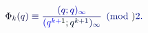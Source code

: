 \documentclass[12pt]{article}
\begin{document}
\makeatletter
\renewcommand*{\@textcolor}[3]{%
  \protect\leavevmode
  \begingroup
    \color#1{#2}#3%
  \endgroup
}
\makeatother
\begin{displaymath}
\mathcolor[RGB]{0,0,15}{\Phi} _ { \mathcolor[RGB]{0,0,30}{k} } \mathcolor[RGB]{0,0,45}{(} \mathcolor[RGB]{0,0,60}{q} \mathcolor[RGB]{0,0,75}{)} \mathcolor[RGB]{0,0,90}{\equiv} \mathcolor[RGB]{0,0,105}{\frac { \mathcolor[RGB]{0,0,120}{(} \mathcolor[RGB]{0,0,135}{q} \mathcolor[RGB]{0,0,150}{;} \mathcolor[RGB]{0,0,165}{q} \mathcolor[RGB]{0,0,180}{)} _ { \mathcolor[RGB]{0,0,195}{\infty} } } { \mathcolor[RGB]{0,0,210}{(} \mathcolor[RGB]{0,0,225}{q} ^ { \mathcolor[RGB]{0,0,240}{k} \mathcolor[RGB]{0,0,255}{+} \mathcolor[RGB]{0,15,0}{1} } \mathcolor[RGB]{0,15,15}{;} \mathcolor[RGB]{0,15,30}{q} ^ { \mathcolor[RGB]{0,15,45}{k} \mathcolor[RGB]{0,15,60}{+} \mathcolor[RGB]{0,15,75}{1} } \mathcolor[RGB]{0,15,90}{)} _ { \mathcolor[RGB]{0,15,105}{\infty} } } } \mathcolor[RGB]{0,15,120}{\pmod} { \mathcolor[RGB]{0,15,135}{2} } \mathcolor[RGB]{0,15,150}{.}
\end{displaymath}
\end{document}
